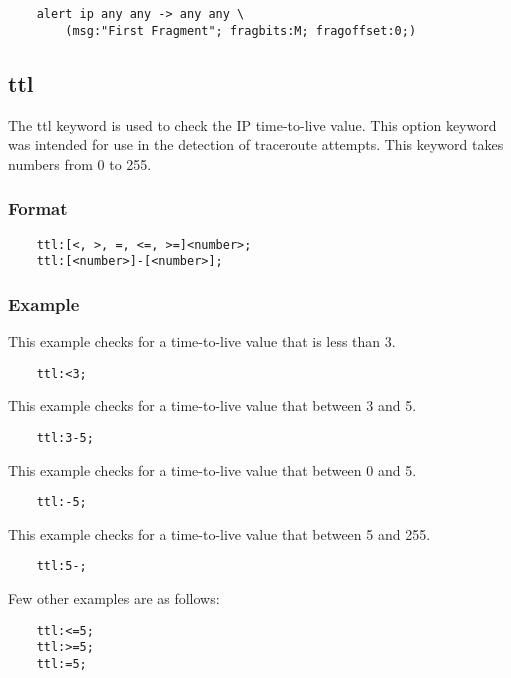 \documentclass[english]{report}
\begin{document}
\begin{verbatim}
    alert ip any any -> any any \
        (msg:"First Fragment"; fragbits:M; fragoffset:0;)
\end{verbatim}

\subsection{ttl}

The ttl keyword is used to check the IP time-to-live value.  This option
keyword was intended for use in the detection of traceroute attempts. This
 keyword takes numbers from 0 to 255.

\subsubsection{Format}

\begin{verbatim}
    ttl:[<, >, =, <=, >=]<number>;
    ttl:[<number>]-[<number>];
\end{verbatim}

\subsubsection{Example}

This example checks for a time-to-live value that is less than 3.

\begin{verbatim}
    ttl:<3;
\end{verbatim}

This example checks for a time-to-live value that between 3 and 5.

\begin{verbatim}
    ttl:3-5;
\end{verbatim}

This example checks for a time-to-live value that between 0 and 5.

\begin{verbatim}
    ttl:-5;
\end{verbatim}

This example checks for a time-to-live value that between 5 and 255.

\begin{verbatim}
    ttl:5-;
\end{verbatim}

Few other examples are as follows:

\begin{verbatim}
    ttl:<=5;
    ttl:>=5;
    ttl:=5;
\end{verbatim}
\end{document}
